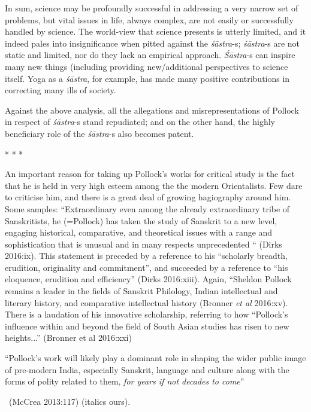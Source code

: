 In sum, science may be profoundly successful in addressing a very narrow set of problems, but vital issues in life, always complex, are not easily or successfully handled by science. The world-view that science presents is utterly limited, and it indeed pales into insignificance when pitted against the \textit{śāstra}-s; \textit{śāstra}-s are not static and limited, nor do they lack an empirical approach. \textit{Śāstra}-s can inspire many new things (including providing new/additional perspectives to science itself. Yoga as a \textit{śāstra}, for example, has made many positive contributions in correcting many ills of society.

Against the above analysis, all the allegations and misrepresentations of Pollock in respect of \textit{śāstra}-s stand repudiated; and on the other hand, the highly beneficiary role of the \textit{śāstra}-s also becomes patent.

\begin{center}
* * *
\end{center}

\vskip -7pt

An important reason for taking up Pollock’s works for critical study is the fact that he is held in very high esteem among the the modern Orientalists. Few dare to criticise him, and there is a great deal of growing hagiography around him. Some samples: “Extraordinary even among the already extraordinary tribe of Sanskritists, he (=Pollock) has taken the study of Sanskrit to a new level, engaging historical, comparative, and theoretical issues with a range and sophistication that is unusual and in many respects unprecedented “ (Dirks 2016:ix). This statement is preceded by a reference to his “scholarly breadth, erudition, originality and commitment”, and succeeded by a reference to “his eloquence, erudition and efficiency” (Dirks 2016:xiii). Again, “Sheldon Pollock remains a leader in the fields of Sanskrit Philology, Indian intellectual and literary history, and comparative intellectual history (Bronner \textit{et al} 2016:xv). There is a laudation of his innovative scholarship, referring to how “Pollock’s influence within and beyond the field of South Asian studies has risen to new heights...”  (Bronner et al 2016:xxi)


\begin{myquote}
“Pollock’s work will likely play a dominant role in shaping the wider public image of pre-modern India, especially Sanskrit, language and culture along with the forms of polity related to them, \textit{for years if not decades to come}” 

~\hfill (McCrea 2013:117) (italics ours).
\end{myquote}

